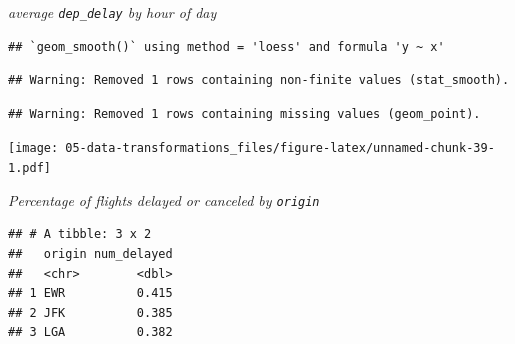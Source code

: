 \documentclass[]{book}
\newenvironment{Shaded}{\begin{snugshade}}{\end{snugshade}}
\newcommand{\DataTypeTok}[1]{\textcolor[rgb]{0.13,0.29,0.53}{#1}}
\newcommand{\DecValTok}[1]{\textcolor[rgb]{0.00,0.00,0.81}{#1}}
\newcommand{\KeywordTok}[1]{\textcolor[rgb]{0.13,0.29,0.53}{\textbf{#1}}}
\newcommand{\NormalTok}[1]{#1}
\newcommand{\OperatorTok}[1]{\textcolor[rgb]{0.81,0.36,0.00}{\textbf{#1}}}
\newcommand{\OtherTok}[1]{\textcolor[rgb]{0.56,0.35,0.01}{#1}}
\newcommand{\StringTok}[1]{\textcolor[rgb]{0.31,0.60,0.02}{#1}}
\theoremstyle{definition}
\theoremstyle{definition}
\theoremstyle{definition}
\theoremstyle{remark}
\begin{document}
\emph{average \texttt{dep\_delay} by hour of day}

\begin{Shaded}
\end{Shaded}

\begin{verbatim}
## `geom_smooth()` using method = 'loess' and formula 'y ~ x'
\end{verbatim}

\begin{verbatim}
## Warning: Removed 1 rows containing non-finite values (stat_smooth).
\end{verbatim}

\begin{verbatim}
## Warning: Removed 1 rows containing missing values (geom_point).
\end{verbatim}

\texttt{[image: 05-data-transformations\_files/figure-latex/unnamed-chunk-39-1.pdf]}

\emph{Percentage of flights delayed or canceled by \texttt{origin}}

\begin{Shaded}
\end{Shaded}

\begin{verbatim}
## # A tibble: 3 x 2
##   origin num_delayed
##   <chr>        <dbl>
## 1 EWR          0.415
## 2 JFK          0.385
## 3 LGA          0.382
\end{verbatim}
\end{document}
